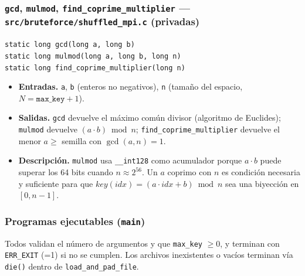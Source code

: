 \documentclass[11pt,letterpaper]{article}
\begin{document}
\subsubsection*{\texttt{gcd}, \texttt{mulmod}, \texttt{find\_coprime\_multiplier} --- \texttt{src/bruteforce/shuffled\_mpi.c} (privadas)}
\small\texttt{static long gcd(long a, long b)}\\
\texttt{static long mulmod(long a, long b, long n)}\\
\texttt{static long find\_coprime\_multiplier(long n)}\normalsize
\begin{itemize}[nosep]
    \item \textbf{Entradas.} \texttt{a}, \texttt{b} (enteros no negativos), \texttt{n} (tamaño del espacio, $N=\texttt{max\_key}+1$).
    \item \textbf{Salidas.} \texttt{gcd} devuelve el máximo común divisor (algoritmo de Euclides); \texttt{mulmod} devuelve $(a\cdot b) \bmod n$; \texttt{find\_coprime\_multiplier} devuelve el menor $a\ge$ semilla con $\gcd(a,n)=1$.
    \item \textbf{Descripción.} \texttt{mulmod} usa \texttt{\_\_int128} como acumulador porque $a\cdot b$ puede superar los 64 bits cuando $n\approx2^{56}$. Un $a$ coprimo con $n$ es condición necesaria y suficiente para que $key(idx)=(a\cdot idx+b)\bmod n$ sea una biyección en $[0,n-1]$.
\end{itemize}

\subsubsection*{Programas ejecutables (\texttt{main})}
Todos validan el número de argumentos y que \texttt{max\_key} $\ge 0$,
y terminan con \texttt{ERR\_EXIT} (=1) si no se cumplen. Los archivos
inexistentes o vacíos terminan vía \texttt{die()} dentro de
\texttt{load\_and\_pad\_file}.
\end{document}
